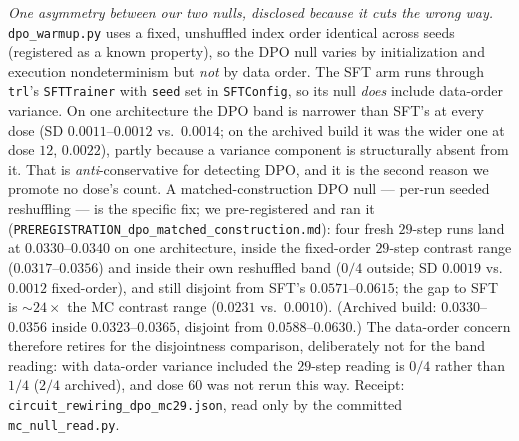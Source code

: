 \documentclass{article}
\begin{document}
\emph{One asymmetry between our two nulls, disclosed because it cuts the wrong way.} \texttt{dpo\_warmup.py} uses a fixed, unshuffled index order identical across seeds (registered as a known property), so the DPO null varies by initialization and execution nondeterminism but \emph{not} by data order. The SFT arm runs through \texttt{trl}'s \texttt{SFTTrainer} with \texttt{seed} set in \texttt{SFTConfig}, so its null \emph{does} include data-order variance. On one architecture the DPO band is narrower than SFT's at every dose (SD $0.0011$--$0.0012$ vs.\ $0.0014$; on the archived build it was the wider one at dose $12$, $0.0022$), partly because a variance component is structurally absent from it. That is \emph{anti}-conservative for detecting DPO, and it is the second reason we promote no dose's count. A matched-construction DPO null --- per-run seeded reshuffling --- is the specific fix; we pre-registered and ran it (\texttt{PREREGISTRATION\_dpo\_matched\_construction.md}): four fresh $29$-step runs land at $0.0330$--$0.0340$ on one architecture, inside the fixed-order $29$-step contrast range ($0.0317$--$0.0356$) and inside their own reshuffled band ($0/4$ outside; SD $0.0019$ vs.\ $0.0012$ fixed-order), and still disjoint from SFT's $0.0571$--$0.0615$; the gap to SFT is ${\sim}24\times$ the MC contrast range ($0.0231$ vs.\ $0.0010$). (Archived build: $0.0330$--$0.0356$ inside $0.0323$--$0.0365$, disjoint from $0.0588$--$0.0630$.) The data-order concern therefore retires for the disjointness comparison, deliberately not for the band reading: with data-order variance included the $29$-step reading is $0/4$ rather than $1/4$ ($2/4$ archived), and dose $60$ was not rerun this way. Receipt: \texttt{circuit\_rewiring\_dpo\_mc29.json}, read only by the committed \texttt{mc\_null\_read.py}.
\end{document}

